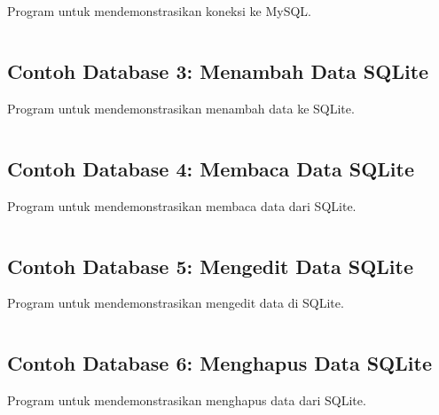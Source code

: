 Program untuk mendemonstrasikan koneksi ke MySQL.

\begin{lstlisting}[language=c++, caption=Koneksi MySQL]

\end{lstlisting}

\subsection{Contoh Database 3: Menambah Data SQLite}

Program untuk mendemonstrasikan menambah data ke SQLite.

\begin{lstlisting}[language=c++, caption=Menambah Data SQLite]

\end{lstlisting}

\subsection{Contoh Database 4: Membaca Data SQLite}

Program untuk mendemonstrasikan membaca data dari SQLite.

\begin{lstlisting}[language=c++, caption=Membaca Data SQLite]

\end{lstlisting}

\subsection{Contoh Database 5: Mengedit Data SQLite}

Program untuk mendemonstrasikan mengedit data di SQLite.

\begin{lstlisting}[language=c++, caption=Mengedit Data SQLite]

\end{lstlisting}

\subsection{Contoh Database 6: Menghapus Data SQLite}

Program untuk mendemonstrasikan menghapus data dari SQLite.

